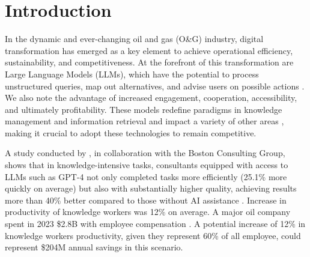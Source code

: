 
\chapter{Introduction}




    In the dynamic and ever-changing oil and gas (O\&G) industry,
    digital transformation has emerged as a key element to achieve operational efficiency, sustainability, and competitiveness. 
    At the forefront of this transformation are Large Language Models (LLMs), which have the potential to process unstructured queries, map out alternatives, and advise users on possible actions \citep{Kar2023}. 
    We also note the advantage of increased engagement, cooperation, accessibility, and ultimately profitability. 
    These models redefine paradigms in knowledge management and information retrieval and impact a variety of other areas \citep{Eckroth2023}, making it crucial to adopt these technologies to remain competitive.    
    
    A study conducted by \citet{Dellacqua2023}, in collaboration with the Boston Consulting Group, shows that in knowledge-intensive tasks, consultants equipped with access to LLMs such as GPT-4 not only completed tasks more efficiently (25.1\% more quickly on average) but also with substantially higher quality, achieving results more than 40\% better compared to those without AI assistance \citep{Dellacqua2023}.
    Increase in productivity of knowledge workers was 12\% on average.    
    A major oil company spent in 2023 \$2.8B with employee compensation \citep{Petrobras2024}.
    A potential increase of 12\% in knowledge workers productivity, given they represent 60\% of all employee, could represent \$204M annual savings in this scenario. 
    
